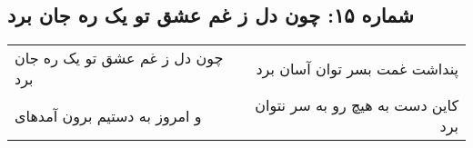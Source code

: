 \begin{center}
\section*{شماره ۱۵: چون دل ز غم عشق تو یک ره جان برد}
\label{sec:015}
\begin{longtable}{l p{0.5cm} r}
چون دل ز غم عشق تو یک ره جان برد
&&
پنداشت غمت بسر توان آسان برد
\\
و امروز به دستیم برون آمدهای
&&
کاین دست به هیچ رو به سر نتوان برد
\\
\end{longtable}
\end{center}
